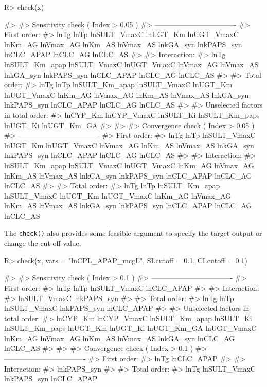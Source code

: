 \documentclass[article]{jss}
\begin{document}
\begin{CodeChunk}

\begin{CodeInput}
R> check(x)
\end{CodeInput}

\begin{CodeOutput}
#> 
#> Sensitivity check ( Index > 0.05 )
#> ----------------------------------
#> First order:
#>  lnTg lnTp lnSULT_VmaxC lnUGT_Km lnUGT_VmaxC lnKm_AG lnVmax_AG lnKm_AS lnVmax_AS lnkGA_syn lnkPAPS_syn lnCLC_APAP lnCLC_AG lnCLC_AS 
#> 
#> Interaction:
#>  lnTg lnSULT_Km_apap lnSULT_VmaxC lnUGT_VmaxC lnVmax_AG lnVmax_AS lnkGA_syn lnkPAPS_syn lnCLC_APAP lnCLC_AG lnCLC_AS 
#> 
#> Total order:
#>  lnTg lnTp lnSULT_Km_apap lnSULT_VmaxC lnUGT_Km lnUGT_VmaxC lnKm_AG lnVmax_AG lnKm_AS lnVmax_AS lnkGA_syn lnkPAPS_syn lnCLC_APAP lnCLC_AG lnCLC_AS 
#> 
#> Unselected factors in total order:
#>  lnCYP_Km lnCYP_VmaxC lnSULT_Ki lnSULT_Km_paps lnUGT_Ki lnUGT_Km_GA 
#> 
#> 
#> Convergence check ( Index > 0.05 )
#> ----------------------------------
#> First order:
#>  lnTg lnTp lnSULT_VmaxC lnUGT_Km lnUGT_VmaxC lnVmax_AG lnKm_AS lnVmax_AS lnkGA_syn lnkPAPS_syn lnCLC_APAP lnCLC_AG lnCLC_AS 
#> 
#> Interaction:
#>  lnSULT_Km_apap lnSULT_VmaxC lnUGT_VmaxC lnKm_AG lnVmax_AG lnKm_AS lnVmax_AS lnkGA_syn lnkPAPS_syn lnCLC_APAP lnCLC_AG lnCLC_AS 
#> 
#> Total order:
#>  lnTg lnTp lnSULT_Km_apap lnSULT_VmaxC lnUGT_Km lnUGT_VmaxC lnKm_AG lnVmax_AG lnKm_AS lnVmax_AS lnkGA_syn lnkPAPS_syn lnCLC_APAP lnCLC_AG lnCLC_AS
\end{CodeOutput}
\end{CodeChunk}

The \texttt{check()} also provides some feasible argument to specify the
target output or change the cut-off value.

\begin{CodeChunk}

\begin{CodeInput}
R> check(x, vars = "lnCPL_APAP_mcgL", SI.cutoff = 0.1, CI.cutoff = 0.1)
\end{CodeInput}

\begin{CodeOutput}
#> 
#> Sensitivity check ( Index > 0.1 )
#> ----------------------------------
#> First order:
#>  lnTg lnTp lnSULT_VmaxC lnCLC_APAP 
#> 
#> Interaction:
#>  lnSULT_VmaxC lnkPAPS_syn 
#> 
#> Total order:
#>  lnTg lnTp lnSULT_VmaxC lnkPAPS_syn lnCLC_APAP 
#> 
#> Unselected factors in total order:
#>  lnCYP_Km lnCYP_VmaxC lnSULT_Km_apap lnSULT_Ki lnSULT_Km_paps lnUGT_Km lnUGT_Ki lnUGT_Km_GA lnUGT_VmaxC lnKm_AG lnVmax_AG lnKm_AS lnVmax_AS lnkGA_syn lnCLC_AG lnCLC_AS 
#> 
#> 
#> Convergence check ( Index > 0.1 )
#> ----------------------------------
#> First order:
#>  lnTg lnCLC_APAP 
#> 
#> Interaction:
#>  lnkPAPS_syn 
#> 
#> Total order:
#>  lnTg lnSULT_VmaxC lnkPAPS_syn lnCLC_APAP
\end{CodeOutput}
\end{CodeChunk}
\end{document}
